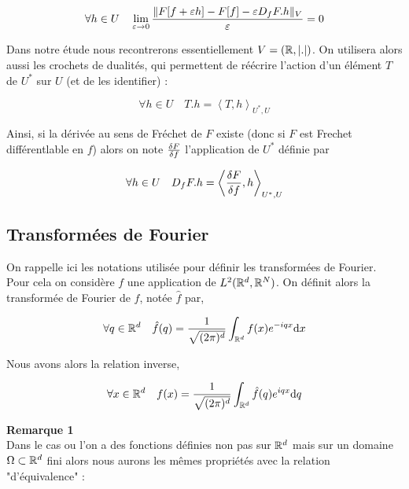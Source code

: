 \documentclass[10pt]{article}
\begin{document}
\begin{multicols}{2}
\begin{equation}
\forall h \in U \quad \lim_{ \varepsilon \rightarrow 0 } \frac{\| F[f+\varepsilon h] - F[f] - \varepsilon D_fF.h\|_V}{\varepsilon}  = 0
\end{equation} 


Dans notre étude nous recontrerons essentiellement $V = (\mathbb{R}, |.|)$. On utilisera alors aussi les crochets de dualités, qui permettent de réécrire l'action d'un élément $T$ de $U^*$ sur $U$ (et de les identifier) : 

\begin{equation}
  \forall h \in U \quad T.h = \left< T, h \right>_{U^*, U}
\end{equation}

Ainsi, si la dérivée au sens de Fréchet de $F$ existe (donc si $F$ est Frechet différentlable en $f$) alors on note $\frac{\delta F}{\delta f}$ l'application de $U^*$ définie par 

\begin{equation}
  \forall h \in U \quad D_fF.h = \left< \frac{\delta F}{\delta f}, h \right>_{U^*, U}
\end{equation}

\vspace*{11pt}



\subsection{Transformées de Fourier}

On rappelle ici les notations utilisée pour définir les transformées de Fourier. Pour cela on considère $f$ une application de $L^2(\mathbb{R}^d, \mathbb{R}^N)$. On définit alors la transformée de Fourier de $f$, notée $\hat{f}$ par, 

\begin{equation}
  \forall q \in \mathbb{R}^d \quad \hat{f}(q) = \frac{1}{\sqrt{(2\pi)^d}}\int_{\mathbb{R}^d} f(x) e^{-iqx}\text{d} x
\end{equation}

Nous avons alors la relation inverse,

\begin{equation}
  \forall x \in \mathbb{R}^d \quad f(x) = \frac{1}{\sqrt{(2\pi)^d}}\int_{\mathbb{R}^d} \hat{f}(q) e^{iqx}\text{d} q
\end{equation}

\textbf{Remarque 1} \\
Dans le cas ou l'on a des fonctions définies non pas sur $\mathbb{R}^d$ mais sur un domaine $\Omega \subset \mathbb{R}^d$ fini alors nous aurons les  mêmes propriétés avec la relation "d'équivalence" : 


\end{multicols}
\end{document}
